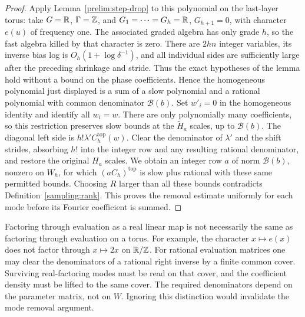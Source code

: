 \begin{proof}
Apply Lemma~\ref{prelim:step-drop} to this polynomial on the last-layer
torus: take $G=\mathbb R$, $\Gamma=\mathbb Z$, and $G_1=\cdots=G_h=\mathbb R$,
$G_{h+1}=0$, with character $e(u)$ of frequency one.  The associated
graded algebra has only grade $h$, so the fast algebra killed by that
character is zero.  There are $2hn$ integer variables, its inverse bias
log is $O_h(1+\log\delta^{-1})$, and all individual sides are sufficiently
large after the preceding shrinkage and stride.  Thus the exact hypotheses
of the lemma hold without a bound on the phase coefficients.  Hence
the homogeneous polynomial just displayed is a sum of a slow polynomial
and a rational polynomial with common denominator $\mathcal B(b)$.
Set $w'_i=0$ in the homogeneous identity and identify all $w_i=w$.
There are only polynomially many coefficients, so this restriction preserves
slow bounds at the $\widetilde H_a$ scales, up to $\mathcal B(b)$.
The diagonal left side is $h!\lambda'C_h^{\mathrm{top}}(w)$.
Clear the denominator of $\lambda'$ and the shift strides, absorbing
$h!$ into the integer row and any resulting rational denominator, and
restore the original $H_a$ scales.  We obtain an integer row $a$ of norm
$\mathcal B(b)$, nonzero on $W_h$, for which $(aC_h)^{\mathrm{top}}$ is
slow plus rational with these same permitted bounds.  Choosing $R$ larger
than all these bounds contradicts Definition~\ref{sampling:rank}.
This proves the removal estimate uniformly for each mode before its
Fourier coefficient is summed.
\end{proof}

\begin{remark}
Factoring through evaluation as a real linear map is not necessarily the
same as factoring through evaluation on a torus.  For example, the character
$x\mapsto e(x)$ does not factor through $x\mapsto2x$ on $\mathbb R/\mathbb Z$.
For rational evaluation matrices one may clear the denominators of a
rational right inverse by a finite common cover.  Surviving real-factoring
modes must be read on that cover, and the coefficient density must be lifted
to the same cover.  The required denominators depend on the parameter
matrix, not on $W$.  Ignoring this distinction would invalidate the mode
removal argument.
\end{remark}

